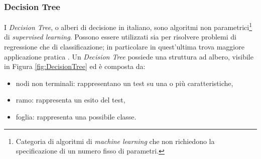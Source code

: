\documentclass[12pt,italian]{report}
\begin{document}
	\subsubsection{Decision Tree}
	\label{DecisionTree}
	I \textit{Decision Tree}, o alberi di decisione in italiano, sono algoritmi non parametrici\footnote{Categoria di algoritmi di \textit{machine learning} che non richiedono la specificazione di un numero fisso di parametri.} di \textit{supervised learning}. Possono essere utilizzati sia per risolvere problemi di regressione che di classificazione; in particolare in quest'ultima trova maggiore applicazione pratica \cite{Kingsford2008}. Un \textit{Decision Tree} possiede una struttura ad albero, visibile in Figura \ref{fig:DecisionTree} ed è composta da:
	\begin{itemize}
		\item nodi non terminali: rappresentano un test su una o più caratteristiche,
		\item ramo: rappresenta un esito del test,
		\item foglia: rappresenta una possibile classe.
	\end{itemize}
	
\end{document}
